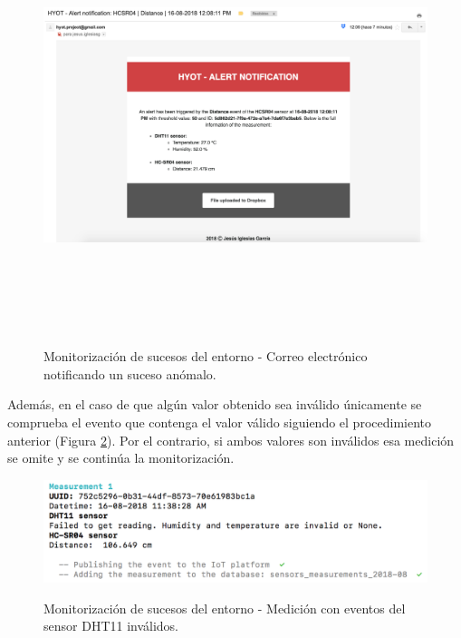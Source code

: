 \documentclass[12pt,a4paper, twoside]{report}
\begin{document}
	 		\begin{figure}[!ht]   
				\caption{Monitorización de sucesos del entorno - Correo electrónico notificando un suceso anómalo.} 
				\begin{center} 
					\includegraphics[width=17cm,height=12cm]{Images/userGuide/monitoring/mailAlert} \\
					\label{fig:userguide_monitoring_mailAlert} 
				\end{center}  
			\end{figure}	 
	
	\newpage
		 
	 Además, en el caso de que algún valor obtenido sea inválido únicamente se comprueba el evento que contenga el valor válido siguiendo el procedimiento anterior (Figura \ref{fig:userguide_monitoring_measurementInvalid}). Por el contrario, si ambos valores son inválidos esa medición se omite y se continúa la monitorización. \\
	 
	 		\begin{figure}[!ht]   
				\caption{Monitorización de sucesos del entorno - Medición con eventos del sensor DHT11 inválidos.} 
				\begin{center} 
					\includegraphics[width=14cm,height=3cm]{Images/userGuide/monitoring/measurementInvalid} \\
					\label{fig:userguide_monitoring_measurementInvalid} 
				\end{center}  
			\end{figure}	 
	 
\end{document}
